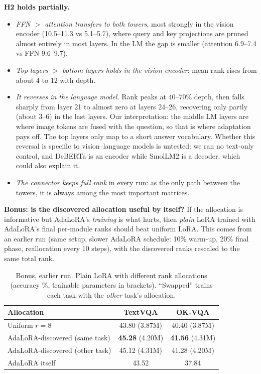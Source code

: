 \documentclass[12pt,a4paper]{article}
\newcommand{\best}[1]{\textbf{#1}}
\begin{document}
\textbf{H2 holds partially.}
\begin{itemize}
    \item \emph{FFN $>$ attention transfers to both towers}, most strongly in the vision encoder (10.5--11.3 vs
    5.1--5.7), where query and key projections are pruned almost entirely in most layers. In the LM the gap is
    smaller (attention 6.9--7.4 vs FFN 9.6--9.7).
    \item \emph{Top layers $>$ bottom layers holds in the vision encoder}: mean rank rises from about 4 to 12 with depth.
    \item \emph{It reverses in the language model.} Rank peaks at 40--70\% depth, then falls sharply from layer 21
    to almost zero at layers 24--26, recovering only partly (about 3--6) in the last layers. Our interpretation: the middle LM layers are where image tokens are fused with the question, so that
    is where adaptation pays off. The top layers only map to a short answer vocabulary.
    Whether this reversal is specific to vision--language models is untested: we ran no text-only control, and
    DeBERTa is an encoder while SmolLM2 is a decoder, which could also explain it.
    \item \emph{The connector keeps full rank} in every run: as the only path between the towers, it is always
    among the most important matrices.
\end{itemize}

\textbf{Bonus: is the discovered allocation useful by itself?} If the allocation is informative but AdaLoRA's
\emph{training} is what hurts, then \emph{plain} LoRA trained with AdaLoRA's final per-module ranks should beat
uniform LoRA. This comes from an earlier run (same setup, slower AdaLoRA schedule: 10\% warm-up, 20\% final phase,
reallocation every 10 steps), with the discovered ranks rescaled to the same total rank.

\begin{table}[!htbp]
\centering\footnotesize\setlength{\abovecaptionskip}{2pt}
\caption{Bonus, earlier run. Plain LoRA with different rank allocations (accuracy \%, trainable parameters in
brackets). ``Swapped'' trains each task with the \emph{other} task's allocation.}
\label{tab:bonus}
\begin{tabular}{@{}lcc@{}}
\toprule
\textbf{Allocation} & \textbf{TextVQA} & \textbf{OK-VQA} \\
\midrule
Uniform $r{=}8$                   & 43.80 (3.87M) & 40.40 (3.87M) \\
AdaLoRA-discovered (same task)    & \best{45.28} (4.20M) & \best{41.56} (4.31M) \\
AdaLoRA-discovered (other task)   & 45.12 (4.31M) & 41.28 (4.20M) \\
AdaLoRA itself                    & 43.52 & 37.84 \\
\bottomrule
\end{tabular}
\end{table}
\end{document}
